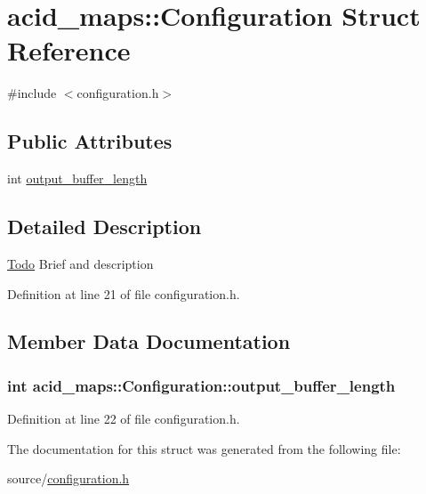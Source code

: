 \hypertarget{structacid__maps_1_1_configuration}{
\section{acid\_\-maps::Configuration Struct Reference}
\label{structacid__maps_1_1_configuration}
}


{\ttfamily \#include $<$configuration.h$>$}

\subsection*{Public Attributes}
\begin{DoxyCompactItemize}
\item 
int \hyperlink{structacid__maps_1_1_configuration_af2605c4a2a28af10c206b630fa7a3377}{output\_\-buffer\_\-length}
\end{DoxyCompactItemize}


\subsection{Detailed Description}
\begin{Desc}
\item[\hyperlink{todo__todo000005}{Todo}]Brief and description \end{Desc}


Definition at line 21 of file configuration.h.



\subsection{Member Data Documentation}
\hypertarget{structacid__maps_1_1_configuration_af2605c4a2a28af10c206b630fa7a3377}{
\subsubsection[{output\_\-buffer\_\-length}]{\setlength{\rightskip}{0pt plus 5cm}int {\bf acid\_\-maps::Configuration::output\_\-buffer\_\-length}}}
\label{structacid__maps_1_1_configuration_af2605c4a2a28af10c206b630fa7a3377}


Definition at line 22 of file configuration.h.



The documentation for this struct was generated from the following file:\begin{DoxyCompactItemize}
\item 
source/\hyperlink{configuration_8h}{configuration.h}\end{DoxyCompactItemize}
